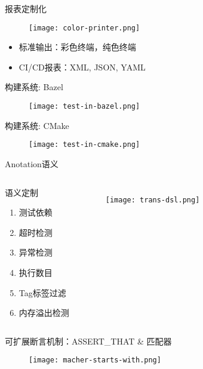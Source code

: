 \begin{frame}{报表定制化}
    \centering
    \begin{figure}
      \centering
      \texttt{[image: color-printer.png]}
    \end{figure}

    \begin{itemize}
    \item \alert{标准输出}：彩色终端，纯色终端
    \item \alert{CI/CD报表}：XML, JSON, YAML
    \end{itemize}    
\end{frame}

\begin{frame}{构建系统: Bazel}
    \centering
    \begin{figure}
      \centering
      \texttt{[image: test-in-bazel.png]}
    \end{figure}
\end{frame}

\begin{frame}{构建系统: CMake}
    \centering
    \begin{figure}
      \centering
      \texttt{[image: test-in-cmake.png]}
    \end{figure}
\end{frame}

\begin{frame}{Anotation语义}
  \begin{columns}
     \begin{block}{语义定制}
       \begin{enumerate}
         \item 测试依赖
         \item 超时检测
         \item 异常检测
         \item 执行数目 
         \item Tag标签过滤
         \item 内存溢出检测
       \end{enumerate}
     \end{block}

    \begin{figure}
      \centering
      \texttt{[image: trans-dsl.png]}
    \end{figure}
  \end{columns}
\end{frame}

\begin{frame}{可扩展断言机制：ASSERT\_THAT \& 匹配器}
    \centering
    \begin{figure}
      \centering
      \texttt{[image: macher-starts-with.png]}
    \end{figure}
\end{frame}

